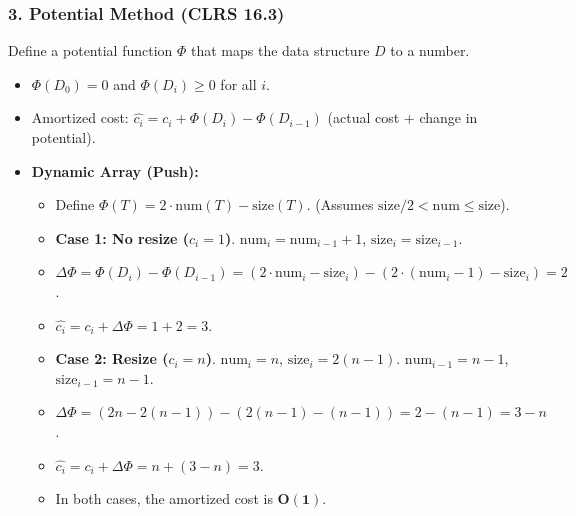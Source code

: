 \subsubsection{3. Potential Method (CLRS 16.3)}
Define a potential function $\Phi$ that maps the data structure $D$ to a number.
\begin{itemize}
    \item $\Phi(D_0) = 0$ and $\Phi(D_i) \ge 0$ for all $i$.
    \item Amortized cost: $\hat{c_i} = c_i + \Phi(D_i) - \Phi(D_{i-1})$ (actual cost + change in potential).
    \item \textbf{Dynamic Array (Push):}
    \begin{itemize}
        \item Define $\Phi(T) = 2 \cdot \text{num}(T) - \text{size}(T)$. (Assumes $\text{size}/2 < \text{num} \le \text{size}$).
        \item \textbf{Case 1: No resize ($c_i=1$)}. $\text{num}_i = \text{num}_{i-1}+1$, $\text{size}_i = \text{size}_{i-1}$.
        \item $\Delta\Phi = \Phi(D_i) - \Phi(D_{i-1}) = (2 \cdot \text{num}_i - \text{size}_i) - (2 \cdot (\text{num}_i-1) - \text{size}_i) = 2$.
        \item $\hat{c_i} = c_i + \Delta\Phi = 1 + 2 = 3$.
        \item \textbf{Case 2: Resize ($c_i=n$)}. $\text{num}_i = n$, $\text{size}_i = 2(n-1)$. $\text{num}_{i-1} = n-1$, $\text{size}_{i-1} = n-1$.
        \item $\Delta\Phi = (2n - 2(n-1)) - (2(n-1) - (n-1)) = 2 - (n-1) = 3 - n$.
        \item $\hat{c_i} = c_i + \Delta\Phi = n + (3 - n) = 3$.
        \item In both cases, the amortized cost is $\mathbf{O(1)}$.
    \end{itemize}
\end{itemize}